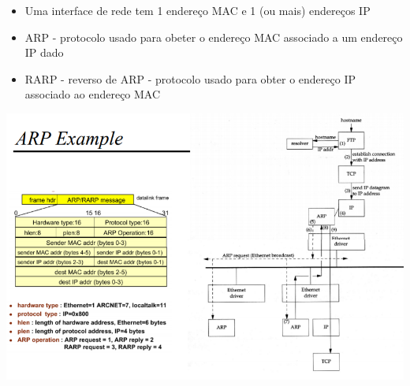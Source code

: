 \documentclass{article}
\begin{document}
\begin{itemize}
    \item Uma interface de rede tem 1 endereço MAC e 1 (ou mais) endereços IP
    \item ARP - protocolo usado para obeter o endereço MAC associado a um endereço IP dado
    \item RARP - reverso de ARP - protocolo usado para obter o endereço IP associado ao endereço MAC
\end{itemize}

\begin{center}
    \includegraphics[width=14cm]{images/RCOM24.png}
\end{center}
\end{document}
